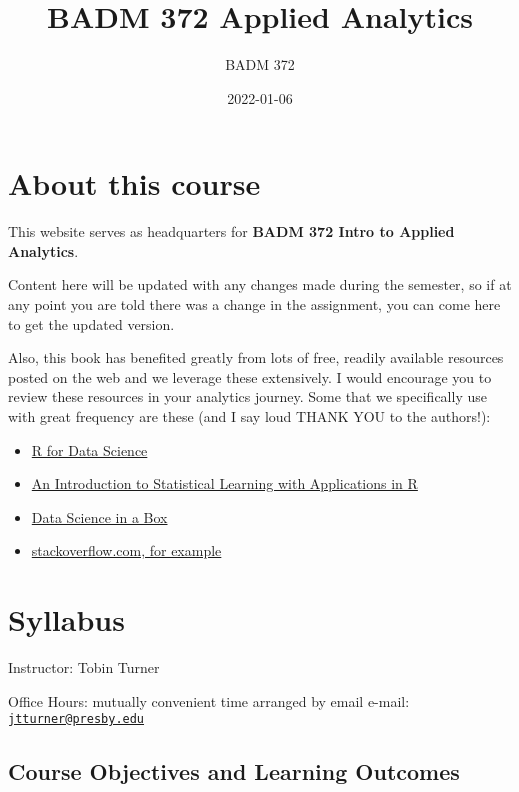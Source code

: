 \documentclass[
]{book}
\title{BADM 372 Applied Analytics}
\author{BADM 372}
\date{2022-01-06}
\providecommand{\tightlist}{%
  \setlength{\itemsep}{0pt}\setlength{\parskip}{0pt}}
\theoremstyle{definition}
\theoremstyle{definition}
\theoremstyle{definition}
\theoremstyle{definition}
\theoremstyle{remark}
\begin{document}
\maketitle

{
\setcounter{tocdepth}{1}
\tableofcontents
}
\hypertarget{about-this-course}{%
\chapter{About this course}\label{about-this-course}}

This website serves as headquarters for \textbf{BADM 372 Intro to Applied Analytics}.

Content here will be updated with any changes made during the semester, so if at any point you are told there was a change in the assignment, you can come here to get the updated version.

Also, this book has benefited greatly from lots of free, readily available resources posted on the web and we leverage these extensively. I would encourage you to review these resources in your analytics journey. Some that we specifically use with great frequency are these (and I say loud THANK YOU to the authors!):

\begin{itemize}
\tightlist
\item
  \href{https://r4ds.had.co.nz/}{R for Data Science}
\item
  \href{https://trevorhastie.github.io/ISLR/}{An Introduction to Statistical Learning with Applications in R}
\item
  \href{https://datasciencebox.org/}{Data Science in a Box}
\item
  \href{https://stackoverflow.com/questions/4862178/remove-rows-with-all-or-some-nas-missing-values-in-data-frame?rq=1}{stackoverflow.com, for example}
\end{itemize}

\hypertarget{syllabus}{%
\chapter{Syllabus}\label{syllabus}}

Instructor: Tobin Turner

Office Hours: mutually convenient time arranged by email e-mail: \href{mailto:jtturner@presby.edu}{\nolinkurl{jtturner@presby.edu}}

\hypertarget{course-objectives-and-learning-outcomes}{%
\section{Course Objectives and Learning Outcomes}\label{course-objectives-and-learning-outcomes}}
\end{document}
